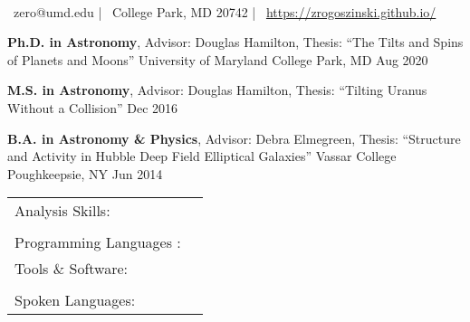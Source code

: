 \documentclass[]{awesome-cv}
\newcommand{\changeurlcolor}[1]{\hypersetup{urlcolor=#1}}
\begin{document}
    
\begin{center}
	  \\
	\vspace{2mm}
	{\faEnvelope\ zero@umd.edu} | {\faMapMarker\ College Park, MD 20742} | {\faLink\ \changeurlcolor{black}\href{https://zrogoszinski.github.io/}{https://zrogoszinski.github.io/}}
\end{center}
\begin{cventries}
	\cventry
	{\textbf{Ph.D. in Astronomy}, Advisor: Douglas Hamilton, Thesis: ``The Tilts and Spins of Planets and Moons''}
	{University of Maryland}
	{College Park, MD}
	{Aug 2020}
	{}
	
	\vspace{-7mm}
	\cventry
	{\textbf{M.S. in Astronomy}, Advisor: Douglas Hamilton, Thesis: ``Tilting Uranus Without a Collision''}
	{}
	{}
	{Dec 2016}
	{}
	
	\vspace{-6mm}
	\cventry
	{\textbf{B.A. in Astronomy \& Physics}, Advisor: Debra Elmegreen, Thesis: ``Structure and Activity in	Hubble Deep Field Elliptical Galaxies''}
	{Vassar College}
	{Poughkeepsie, NY}
	{Jun 2014}
	{}
\end{cventries}

\vspace{-5mm}

\begin{cventries}
	\vspace{-3mm}
	\cventry
	{}
	{\def\arraystretch{1.15}{\begin{tabular}{ l l }
		Analysis Skills: & {\skill {Data Mining, Data Visualization, High Performance Computing,}}\\
		& {\skill {Multiprocessing, Statistics and Probability}} \\
		Programming Languages :  & {\skill{ Python, C, \LaTeX, Mathematica, shell scripting, HTML/CSS}} \\
		Tools \& Software:  & {\skill{ HDF5, Numpy, Matplotlib, Pandas, Scikit-learn, SciPy, Seaborn}} \\
		& {\skill{ Git, Jupyter Notebook, Microsoft Office, Slurm, Unix/Linux}} \\
		Spoken Languages:  & {\skill{ English (native), Hebrew (advanced)}} \\
		\end{tabular}}}
	{}
	{}
	{}
\end{cventries}
\end{document}
